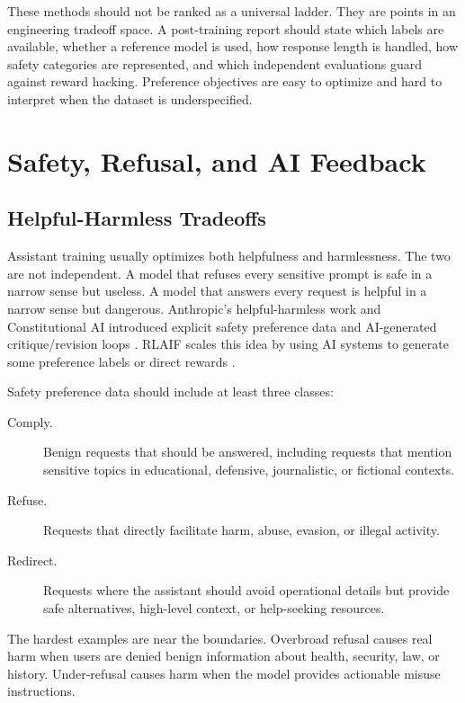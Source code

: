 These methods should not be ranked as a universal ladder. They are points in an engineering tradeoff space. A post-training report should state which labels are available, whether a reference model is used, how response length is handled, how safety categories are represented, and which independent evaluations guard against reward hacking. Preference objectives are easy to optimize and hard to interpret when the dataset is underspecified.

\section{Safety, Refusal, and AI Feedback}
\subsection{Helpful-Harmless Tradeoffs}
Assistant training usually optimizes both helpfulness and harmlessness. The two are not independent. A model that refuses every sensitive prompt is safe in a narrow sense but useless. A model that answers every request is helpful in a narrow sense but dangerous. Anthropic's helpful-harmless work and Constitutional AI introduced explicit safety preference data and AI-generated critique/revision loops \cite{bai2022training,bai2022constitutional}. RLAIF scales this idea by using AI systems to generate some preference labels or direct rewards \cite{lee2023rlaif}.

Safety preference data should include at least three classes:
\begin{description}
    \item[Comply.] Benign requests that should be answered, including requests that mention sensitive topics in educational, defensive, journalistic, or fictional contexts.
    \item[Refuse.] Requests that directly facilitate harm, abuse, evasion, or illegal activity.
    \item[Redirect.] Requests where the assistant should avoid operational details but provide safe alternatives, high-level context, or help-seeking resources.
\end{description}
The hardest examples are near the boundaries. Overbroad refusal causes real harm when users are denied benign information about health, security, law, or history. Under-refusal causes harm when the model provides actionable misuse instructions.

